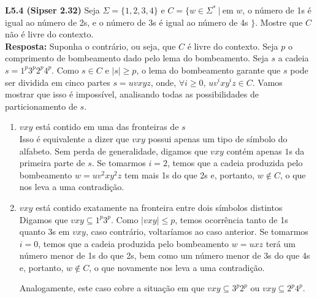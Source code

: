
\noindent \textbf{L5.4 (Sipser 2.32)} Seja $\Sigma = \{1, 2, 3, 4\}$ e $C = \{w \in \Sigma^* \ |\ $em $w$, o número de 1s é igual ao número de 2s, e o número de 3s é igual ao número de 4s $\}$. Mostre que $C$ não é livre do contexto.\\[3pt]
\textbf{Resposta: } Suponha o contrário, ou seja, que $C$ é livre do contexto. Seja $p$ o comprimento de bombeamento dado pelo lema do bombeamento. Seja $s$ a cadeia $s = 1^p3^p2^p4^p$. Como $s \in C$ e $|s| \geq p$, o lema do bombeamento garante que $s$ pode ser dividida em cinco partes $s = uvxyz$, onde, $\forall i \geq 0$, $uv^ixy^iz \in C$. Vamos mostrar que isso é impossível, analisando todas as possibilidades de particionamento de $s$.

\begin{enumerate}[label={\textbf{Caso \arabic*:}}]
    \item $vxy$ está contido em uma das fronteiras de $s$\\[2pt]
    Isso é equivalente a dizer que $vxy$ possui apenas um tipo de símbolo do alfabeto. Sem perda de generalidade, digamos que $vxy$ contém apenas $1$s da primeira parte de $s$. Se tomarmos $i = 2$, temos que a cadeia produzida pelo bombeamento $w = uv^2xy^2z$ tem mais 1s do que 2s e, portanto, $w \notin C$, o que nos leva a uma contradição.
    
    \item $vxy$ está contido exatamente na fronteira entre dois símbolos distintos\\[2pt]
    Digamos que $vxy \subseteq 1^p3^p$. Como $|vxy| \leq p$, temos ocorrência tanto de 1s quanto 3s em $vxy$, caso contrário, voltaríamos ao caso anterior. Se tomarmos $i = 0$, temos que a cadeia produzida pelo bombeamento $w = uxz$ terá um número menor de 1s do que 2s, bem como um número menor de 3s do que 4s e, portanto, $w \notin C$, o que novamente nos leva a uma contradição.
    
    Analogamente, este caso cobre a situação em que $vxy \subseteq 3^p2^p$ ou $vxy \subseteq 2^p4^p$.
\end{enumerate}
